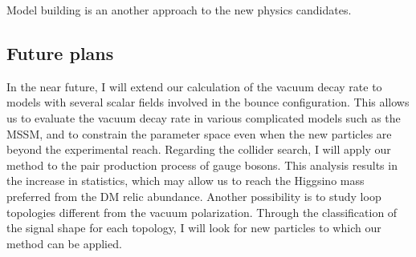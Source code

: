 \documentclass[12pt,notitlepage]{article}
\def\rem#1{ {\bf\textcolor{red}{($\clubsuit$ #1 $\clubsuit$)}}}
\begin{document}

Model building is an another approach to the new physics candidates.





\vspace*{-2mm}
\subsection*{Future plans}

In the near future, I will extend our calculation of the vacuum decay rate to models with several scalar fields involved in the bounce configuration.
This allows us to evaluate the vacuum decay rate in various complicated models such as the MSSM, and to constrain the parameter space even when the new particles are beyond the experimental reach.
Regarding the collider search, I will apply our method to the pair production process of gauge bosons.
This analysis results in the increase in statistics, which may allow us to reach the Higgsino mass preferred from the DM relic abundance.
Another possibility is to study loop topologies different from the vacuum polarization.
Through the classification of the signal shape for each topology, I will look for new particles to which our method can be applied.
\end{document}
